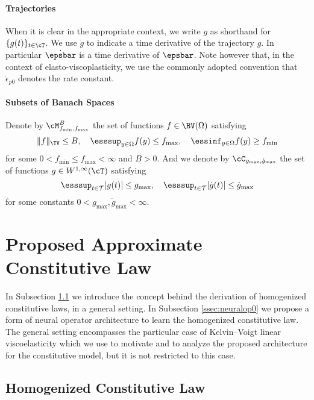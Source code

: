 \documentclass[letterpaper,11pt]{article}
\begin{document}
\paragraph{Trajectories}
When it is clear in the appropriate context, we write $g$  as shorthand for 
$\{g(t)\}_{t\in\cT}$. We use $\dot{g}$ to indicate a time derivative of the trajectory $g$. In particular $\dot{\epsbar}$ is a time derivative of $\epsbar$. Note however that, in the context of elasto-viscoplasticity, we use the commonly adopted convention that $\dot{\epsilon}_{p0}$ denotes the rate constant.

\paragraph{Subsets of Banach Spaces}

Denote by $\cM_{f_{\min}, f_{\max}}^B$  the set of functions $f \in \BV(\Omega)$ satisfying
\begin{equation}
    \|f\|_{\TV} \leq B, \quad \esssup_{y \in \Omega}f(y) \leq f_{\max}, \quad \essinf_{y \in \Omega}f(y) \geq f_{\min}
\end{equation}
for some $0 < f_{\min} \leq f_{\max} < \infty$ and $B>0.$ And we denote by $\cC_{g_{\max}, \dot{g}_{\max}}$ the set of functions $g\in W^{1, \infty}(\cT)$ satisfying
\begin{equation}
    \esssup_{t \in \mathcal{T}}|g(t)| \leq g_{\max}, \quad \esssup_{t \in \mathcal{T}}|\dot{g}(t)| \leq \dot{g}_{\max}
\end{equation}
for some constants $0 < g_{\max}, \dot{g}_{\max} < \infty$.


\section{Proposed Approximate Constitutive Law}\label{sec:PACL}


In Subsection \ref{ssec:HCL} we introduce the concept behind the derivation of homogenized constitutive laws, in a general setting. In Subsection \ref{ssec:neuralop0} we propose a form of neural operator architecture to learn the homogenized constitutive law. The general setting encompasses the particular case of Kelvin--Voigt linear viscoelasticity which we use to motivate and to analyze the proposed architecture for the constitutive model, but it is not restricted to this case.


\subsection{Homogenized Constitutive Law}\label{ssec:HCL}
\end{document}
